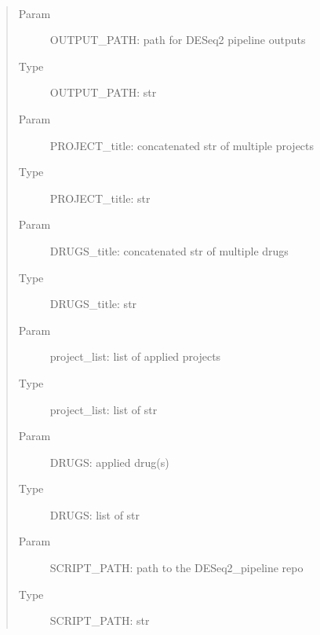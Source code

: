 \documentclass[letterpaper,10pt,english]{sphinxmanual}
\begin{document}

\begin{fulllineitems}
\label{\detokenize{index:create_matrix_new.create_snake_config}}~\begin{quote}\begin{description}
\item[{Param}] \leavevmode
\sphinxAtStartPar
OUTPUT\_PATH: path for DESeq2 pipeline outputs

\item[{Type}] \leavevmode
\sphinxAtStartPar
OUTPUT\_PATH: str

\item[{Param}] \leavevmode
\sphinxAtStartPar
PROJECT\_title: concatenated str of multiple projects

\item[{Type}] \leavevmode
\sphinxAtStartPar
PROJECT\_title: str

\item[{Param}] \leavevmode
\sphinxAtStartPar
DRUGS\_title: concatenated str of multiple drugs

\item[{Type}] \leavevmode
\sphinxAtStartPar
DRUGS\_title: str

\item[{Param}] \leavevmode
\sphinxAtStartPar
project\_list: list of applied projects

\item[{Type}] \leavevmode
\sphinxAtStartPar
project\_list: list of str

\item[{Param}] \leavevmode
\sphinxAtStartPar
DRUGS: applied drug(s)

\item[{Type}] \leavevmode
\sphinxAtStartPar
DRUGS: list of str

\item[{Param}] \leavevmode
\sphinxAtStartPar
SCRIPT\_PATH: path to the DESeq2\_pipeline repo

\item[{Type}] \leavevmode
\sphinxAtStartPar
SCRIPT\_PATH: str


\end{description}
\end{quote}
\end{fulllineitems}
\end{document}
